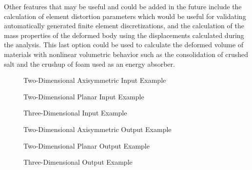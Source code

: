 Other features that may be useful and could be added in the future
include the calculation of element distortion parameters which would
be useful for validating automatically generated finite element
discretizations, and the calculation of the mass properties of the
deformed body using the displacements calculated during the analysis.
This last option could be used to calculate the deformed volume of
materials with nonlinear volumetric behavior such as the consolidation
of crushed salt and the crushup of foam used as an energy absorber. 
\clearpage
\begin{figure}

\caption{Two-Dimensional Axisymmetric Input Example}
\end{figure}
\begin{figure}

\caption{Two-Dimensional Planar Input Example}
\end{figure}
\begin{figure}

\caption{Three-Dimensional Input Example}
\end{figure}
\begin{figure}

\caption{Two-Dimensional Axisymmetric Output Example}
\end{figure}
\begin{figure}

\caption{Two-Dimensional Planar Output Example}
\end{figure}
\begin{figure}

\caption{Three-Dimensional Output Example}
\end{figure}
